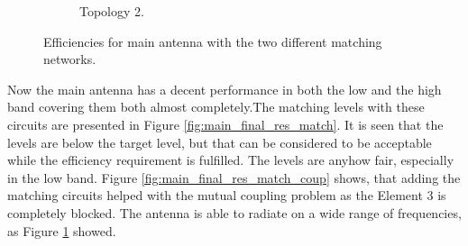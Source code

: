 \begin{figure}[H]
\begin{subfigure}[b]{0.49\textwidth}
        \caption{Topology 2.}
        \label{fig:main_eff_top2}
    \end{subfigure}
    \caption{Efficiencies for main antenna with the two different matching networks.}
    \label{fig:main_eff}
\end{figure}

Now the main antenna has a decent performance in both the low and the high band covering them both almost completely.The matching levels with these circuits are presented in Figure \ref{fig:main_final_res_match}. It is seen that the levels are below the target level, but that can be considered to be acceptable while the efficiency requirement is fulfilled. The levels are anyhow fair, especially in the low band. Figure \ref{fig:main_final_res_match_coup} shows, that adding the matching circuits helped with the mutual coupling problem as the Element 3 is completely blocked. The antenna is able to radiate on a wide range of frequencies, as Figure \ref{fig:main_eff_top2} showed.  
